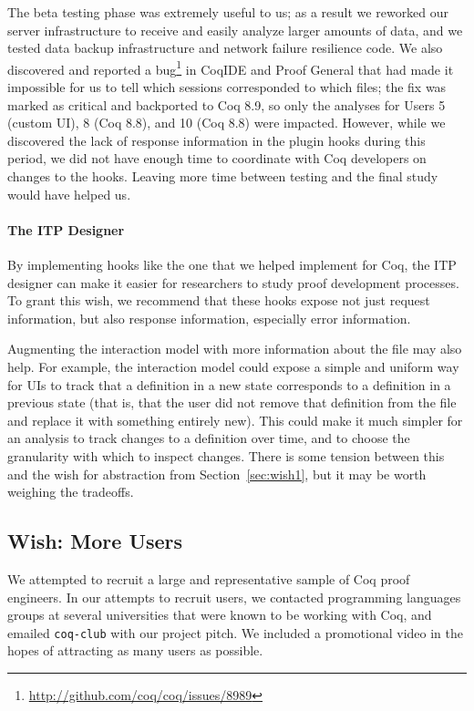 The beta testing phase was extremely useful to us; as a result we
reworked our server infrastructure to receive and easily
analyze larger amounts of data, and we tested data backup
infrastructure and network failure resilience code. 
We also discovered and reported a 
bug\footnote{\url{http://github.com/coq/coq/issues/8989}} in CoqIDE and 
Proof General that had made it impossible for us to tell which 
sessions corresponded to which files; the fix was marked as critical 
and backported to Coq 8.9, so only the analyses for Users 5 (custom UI), 8 (Coq 8.8), and 10 (Coq 8.8) were impacted.
However, while we discovered the lack of response information in the plugin hooks
during this period, we did not have enough time to coordinate with Coq developers on
changes to the hooks. 
Leaving more time between testing and the final study would have helped us.

\paragraph{The ITP Designer} 
By implementing hooks like the one that we helped implement for Coq,
the ITP designer can make it easier for researchers to study 
proof development processes. 
To grant this wish, we recommend that these hooks expose not just 
request information, but also response information, 
especially error information.

Augmenting the interaction model with more information
about the file may also help.
For example,
the interaction model could expose a simple and uniform way for UIs
to track that a definition in a new state corresponds to a definition 
in a previous state (that is, that the user did not remove that
definition from the file and replace it with something entirely new). 
This could make it much simpler for an analysis to track changes to a definition over time,
and to choose the granularity with which to inspect changes.
There is some tension between this and the wish for abstraction from
Section~\ref{sec:wish1}, but it may be worth weighing the tradeoffs.

\subsection{Wish: More Users}
\label{sec:wish3}

We attempted to recruit a large and representative sample of Coq proof
engineers.
In our attempts to recruit users, we contacted programming
languages groups at several universities that were known to be working
with Coq, and emailed \lstinline{coq-club} with our project
pitch. We included a promotional video in the hopes of
attracting as many users as possible.

